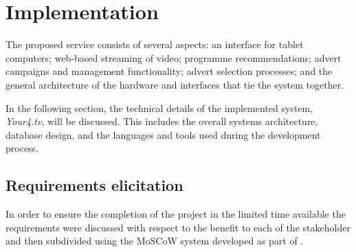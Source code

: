 \section{Implementation}
\label{sec:implementation}

The proposed service consists of several aspects: an interface for tablet computers; web-based streaming of video; programme recommendations; advert campaigns and management functionality; advert selection processes; and the general architecture of the hardware and interfaces that tie the system together.

In the following section, the technical details of the implemented system, \textit{Your4.tv}, will be discussed. This includes the overall systems architecture, database design, and the languages and tools used during the development process.

\subsection{Requirements elicitation}
In order to ensure the completion of the project in the limited time available the requirements were discussed with respect to the benefit to each of the stakeholder and then subdivided using the MoSCoW system developed as part of \citet{clegg1994case}.

